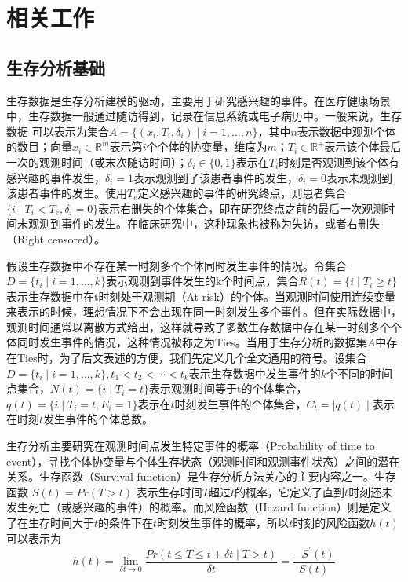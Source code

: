 \chapter{相关工作}

\section{生存分析基础}
生存数据是生存分析建模的驱动，主要用于研究感兴趣的事件。在医疗健康场景中，生存数据一般通过随访得到，记录在信息系统或电子病历中。一般来说，生存数据 可以表示为集合$A=\{(x_i,T_i,\delta_i ) \mid i=1,\dots,n\}$，其中$n$表示数据中观测个体的数目；向量$x_i\in \mathbb{R}^m$表示第$i$个个体的协变量，维度为$m$；$T_i\in \mathbb{R}^+$表示该个体最后一次的观测时间（或末次随访时间）；$\delta_i\in \{0,1\}$表示在$T_i$时刻是否观测到该个体有感兴趣的事件发生，$\delta_i=1$表示观测到了该患者事件的发生，$\delta_i=0$表示未观测到该患者事件的发生。使用$T_e$定义感兴趣的事件的研究终点，则患者集合$\{i \mid T_i<T_e,\delta_i=0\}$表示右删失的个体集合，即在研究终点之前的最后一次观测时间未观测到事件的发生。在临床研究中，这种现象也被称为失访，或者右删失（Right censored）。

假设生存数据中不存在某一时刻多个个体同时发生事件的情况。令集合$D=\{t_i \mid i=1,\dots,k\}$表示观测到事件发生的k个时间点，集合$R(t)=\{i \mid T_i\ge t\}$表示生存数据中在t时刻处于观测期（At risk）的个体。当观测时间使用连续变量来表示的时候，理想情况下不会出现在同一时刻发生多个事件。但在实际数据中，观测时间通常以离散方式给出，这样就导致了多数生存数据中存在某一时刻多个个体同时发生事件的情况，这种情况被称之为Ties。当用于生存分析的数据集$A$中存在Ties时，为了后文表述的方便，我们先定义几个全文通用的符号。设集合$D=\{t_i \mid i=1,\dots,k\},t_1<t_2<\cdots<t_k$表示生存数据中发生事件的$k$个不同的时间点集合，$N(t)=\{i \mid T_i=t\}$表示观测时间等于t的个体集合，$q(t)=\{i \mid T_i=t,E_i=1\}$表示在$t$时刻发生事件的个体集合，$C_t=\mid q(t) \mid$表示在时刻$t$发生事件的个体总数。

生存分析主要研究在观测时间点发生特定事件的概率（Probability of time to event），寻找个体协变量与个体生存状态（观测时间和观测事件状态）之间的潜在关系。生存函数（Survival function）是生存分析方法关心的主要内容之一。生存函数 $S(t)=Pr(T>t)$ 表示生存时间$T$超过$t$的概率，它定义了直到$t$时刻还未发生死亡（或感兴趣的事件）的概率。而风险函数（Hazard function）则是定义了在生存时间大于$t$的条件下在$t$时刻发生事件的概率，所以$t$时刻的风险函数$h(t)$可以表示为
\begin{equation}
h(t)=\lim_{\delta t \rightarrow 0} \frac{Pr(t \le T\le t + \delta t \mid T>t)}{\delta t}
    =\frac{-S^{'}(t)}{S(t)} \label{F1}
\end{equation}

